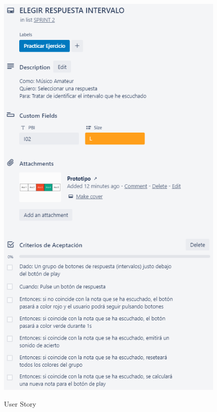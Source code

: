 \documentclass[12pt,twoside,titlepage]{report}
\begin{document}
{\begin{figure}[H]
    \centering
    \includegraphics[scale=1.3]{Scrum/User Stories/IntervalosRespuestas}
    \label{fig:IntervalosRespuestas}
    \caption{User Story}
\end{figure}

}
\end{document}
